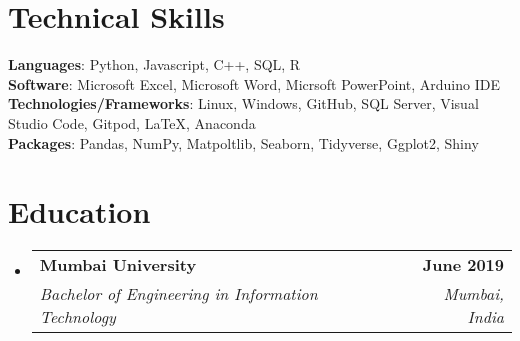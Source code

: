 \documentclass[letterpaper,11pt]{article}
\makeatletter
\newcommand{\resumeSubheading}[4]{
  \vspace{-2pt}\item
    \begin{tabular*}{1.0\textwidth}[t]{l@{\extracolsep{\fill}}r}
      \textbf{#1} & \textbf{\small #2} \\
      \textit{\small#3} & \textit{\small #4} \\
    \end{tabular*}\vspace{-7pt}
}
\newcommand{\resumeSubHeadingListStart}{\begin{itemize}[leftmargin=0.0in, label={}]}
\newcommand{\resumeSubHeadingListEnd}{\end{itemize}}
\makeatother
\begin{document}
\section{Technical Skills}
\begin{itemize}[leftmargin=0.15in, label={}]
  \small{\item{
                \textbf{Languages}{: Python, Javascript, C++, SQL, R}  \\
                \textbf{Software}{: Microsoft Excel, Microsoft Word, Micrsoft PowerPoint, Arduino IDE} \\
                \textbf{Technologies/Frameworks}{: Linux, Windows, GitHub, SQL Server, Visual Studio Code, Gitpod, LaTeX, Anaconda } \\
                \textbf{Packages}{: Pandas, NumPy, Matpoltlib, Seaborn, Tidyverse, Ggplot2, Shiny} \\
          }}

\end{itemize}
\vspace{-6pt}


\section{Education}
\resumeSubHeadingListStart
\resumeSubheading
{Mumbai University}{June 2019}
{Bachelor of Engineering in Information Technology}{Mumbai, India}
\resumeSubHeadingListEnd
\vspace{-6pt}

\end{document}
